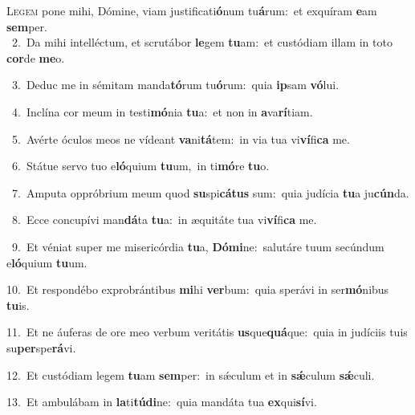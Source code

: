 \lettrine{\initial\textcolor{\initialcolor}{L}}{egem} pone mihi, Dómine, viam justificati\-\textbf{ó}\-num tu\-\textbf{á}\-rum:~\star et exquíram \textbf{e}\-am \textbf{sem}\-per.\\
{\numbfont\textcolor{\numbcolor}{~2.}}~Da mihi intelléctum, et scrutábor \textbf{le}\-gem \textbf{tu}\-am:~\star et custódiam illam in toto \textbf{cor}\-de \textbf{me}\-o.\par
{\numbfont\textcolor{\numbcolor}{~3.}}~Deduc me in sémitam manda\-\textbf{tó}\-rum tu\-\textbf{ó}\-rum:~\star quia \textbf{ip}\-sam \textbf{vó}\-lui.\par
{\numbfont\textcolor{\numbcolor}{~4.}}~Inclína cor meum in testi\-\textbf{mó}\-nia \textbf{tu}\-a:~\star et non in \textbf{a}\-va\-\textbf{rí}\-tiam.\par
{\numbfont\textcolor{\numbcolor}{~5.}}~Avérte óculos meos ne vídeant \textbf{va}\-ni\-\textbf{tá}\-tem:~\star in via tua vi\-\textbf{ví}\-fi\textbf{ca} me.\par
{\numbfont\textcolor{\numbcolor}{~6.}}~Státue servo tuo e\-\textbf{ló}\-quium \textbf{tu}\-um,~\star in ti\-\textbf{mó}\-re \textbf{tu}\-o.\par
{\numbfont\textcolor{\numbcolor}{~7.}}~Amputa oppróbrium meum quod \textbf{su}\-spi\-\textbf{cá}\-\textbf{tus} sum:~\star quia judícia \textbf{tu}\-a ju\-\textbf{cún}\-da.\par
{\numbfont\textcolor{\numbcolor}{~8.}}~Ecce concupívi man\-\textbf{dá}\-ta \textbf{tu}\-a:~\star in æquitáte tua vi\-\textbf{ví}\-fi\textbf{ca} me.\par
{\numbfont\textcolor{\numbcolor}{~9.}}~Et véniat super me misericórdia \textbf{tu}\-a, \textbf{Dó}\-\textbf{mi}ne:~\star salutáre tuum secúndum e\-\textbf{ló}\-quium \textbf{tu}\-um.\par
{\numbfont\textcolor{\numbcolor}{10.}}~Et respondébo exprobrántibus \textbf{mi}\-hi \textbf{ver}\-bum:~\star quia sperávi in ser\-\textbf{mó}\-nibus \textbf{tu}\-is.\par
{\numbfont\textcolor{\numbcolor}{11.}}~Et ne áuferas de ore meo verbum veritátis \textbf{us}\-que\-\textbf{quá}\-que:~\star quia in judíciis tuis su\-\textbf{per}\-spe\-\textbf{rá}\-vi.\par
{\numbfont\textcolor{\numbcolor}{12.}}~Et custódiam legem \textbf{tu}\-am \textbf{sem}\-per:~\star in sǽculum et in \textbf{sǽ}\-culum \textbf{sǽ}\-culi.\par
{\numbfont\textcolor{\numbcolor}{13.}}~Et ambulábam in \textbf{la}\-ti\-\textbf{tú}\-\textbf{di}ne:~\star quia mandáta tua \textbf{ex}\-qui\-\textbf{sí}\-vi.\par

